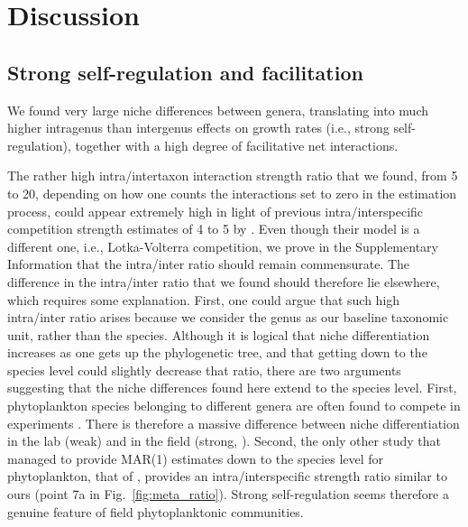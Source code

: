 \documentclass[10pt]{article}
\begin{document}
\section*{Discussion}

\subsection*{Strong self-regulation and facilitation}

We found very large niche differences between genera, translating
into much higher intragenus than intergenus effects on growth rates
(i.e., strong self-regulation), together with a high degree of facilitative
net interactions.

The rather high intra/intertaxon interaction strength ratio \citep{levine_importance_2009}
that we found, from 5 to 20, depending on how one counts the interactions
set to zero in the estimation process, could appear extremely high
in light of previous intra/interspecific competition strength estimates
of 4 to 5 by \citet{adler_competition_2018}. Even
though their model is a different one, i.e., Lotka-Volterra competition,
we prove in the Supplementary Information that the intra/inter ratio
should remain commensurate. The difference in the intra/inter ratio
that we found should therefore lie elsewhere, which requires some
explanation. First, one could argue that such high intra/inter ratio
arises because we consider the genus as our baseline taxonomic unit,
rather than the species. Although it is logical that niche differentiation
increases as one gets up the phylogenetic tree, and that getting down
to the species level could slightly decrease that ratio, there are
two arguments suggesting that the niche differences found here extend
to the species level. First, phytoplankton species belonging to different genera
are often found to compete in experiments \citep{titman_ecological_1976,tilman_phytoplankton_1982,descamps-julien_stable_2005}.
There is therefore a massive difference between niche differentiation in the lab (weak)
and in the field (strong, \citealt{barraquand_coastal_2018}). Second, the
only other study that managed to provide MAR(1) estimates down to
the species level for phytoplankton, that of \citet{huber_role_2006},
provides an intra/interspecific strength ratio similar to ours (point
7a in Fig.~\ref{fig:meta_ratio}). Strong self-regulation seems therefore
a genuine feature of field phytoplanktonic communities.
\end{document}
